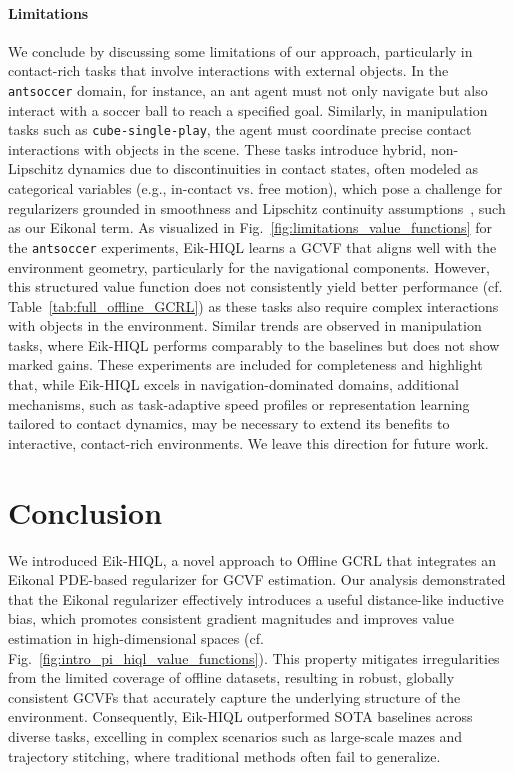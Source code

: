 \documentclass{article}
\theoremstyle{plain}
\theoremstyle{definition}
\theoremstyle{remark}
\begin{document}
\paragraph{Limitations} We conclude by discussing some limitations of our approach, particularly in contact-rich tasks that involve interactions with external objects. In the \texttt{antsoccer} domain, for instance, an ant agent must not only navigate but also interact with a soccer ball to reach a specified goal. Similarly, in manipulation tasks such as \texttt{cube-single-play}, the agent must coordinate precise contact interactions with objects in the scene. These tasks introduce hybrid, non-Lipschitz dynamics due to discontinuities in contact states, often modeled as categorical variables (e.g., in-contact vs. free motion), which pose a challenge for regularizers grounded in smoothness and Lipschitz continuity assumptions~\cite{kim2021hamilton}, such as our Eikonal term. As visualized in Fig.~\ref{fig:limitations_value_functions} for the \texttt{antsoccer} experiments, Eik-HIQL learns a GCVF that aligns well with the environment geometry, particularly for the navigational components. However, this structured value function does not consistently yield better performance (cf. Table~\ref{tab:full_offline_GCRL}) as these tasks also require complex interactions with objects in the environment. Similar trends are observed in manipulation tasks, where Eik-HIQL performs comparably to the baselines but does not show marked gains. These experiments are included for completeness and highlight that, while Eik-HIQL excels in navigation-dominated domains, additional mechanisms, such as task-adaptive speed profiles or representation learning tailored to contact dynamics, may be necessary to extend its benefits to interactive, contact-rich environments. We leave this direction for future work.

\vspace{-0.0cm}
\section{Conclusion}
\vspace{-0.0cm}
We introduced Eik-HIQL, a novel approach to Offline GCRL that integrates an Eikonal PDE-based regularizer for GCVF estimation. Our analysis demonstrated that the Eikonal regularizer effectively introduces a useful distance-like inductive bias, which promotes consistent gradient magnitudes and improves value estimation in high-dimensional spaces (cf. Fig.~\ref{fig:intro_pi_hiql_value_functions}). This property mitigates irregularities from the limited coverage of offline datasets, resulting in robust, globally consistent GCVFs that accurately capture the underlying structure of the environment. Consequently, Eik-HIQL outperformed SOTA baselines across diverse tasks, excelling in complex scenarios such as large-scale mazes and trajectory stitching, where traditional methods often fail to generalize.
\end{document}
